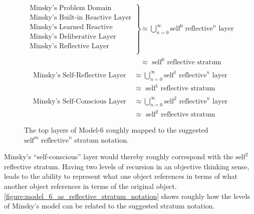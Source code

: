 \begin{figure}[bth]
  \begin{align*}
    \left.
    \begin{array}{l}
      \text{Minsky's Problem Domain }\\
      \text{Minsky's Built-in Reactive Layer }\\
      \text{Minsky's Learned Reactive Layer }\\
      \text{Minsky's Deliberative Layer }\\
      \text{Minsky's Reflective Layer }\\
    \end{array}
    \right\}                               &{\approx} \bigcup_{n=0}^{\infty}{\text{self}^0\text{ reflective}^n\text{ layer}} \\
                                           &{\approx} \text{ self}^0\text{ reflective stratum} \\
  \end{align*}
  \begin{align*}
    \text{Minsky's Self-Reflective Layer } &{\approx} \bigcup_{n=0}^{\infty}{\text{self}^1\text{ reflective}^n\text{ layer}} \\
                                           &{\approx} \text{ self}^1\text{ reflective stratum} \\
  \end{align*}
  \begin{align*}
    \text{Minsky's Self-Conscious Layer }  &{\approx} \bigcup_{n=0}^{\infty}{\text{self}^2\text{ reflective}^n\text{ layer}} \\
                                           &{\approx} \text{ self}^2\text{ reflective stratum}
  \end{align*}
\caption{The top layers of Model-6 roughly mapped to the suggested
  $\text{self}^m\text{ reflective}^n$ stratum notation.}
\label{figure:model_6_as_reflective_stratum_notation}
\end{figure}

Minsky's ``self-conscious'' layer would thereby roughly correspond
with the $\text{self}^2$ reflective stratum.  Having two levels of
recursion in an objective thinking sense, leads to the ability to
represent what one object references in terms of what another object
references in terms of the original object.
\autoref{figure:model_6_as_reflective_stratum_notation} shows roughly
how the levels of Minsky's model can be related to the suggested
stratum notation.

